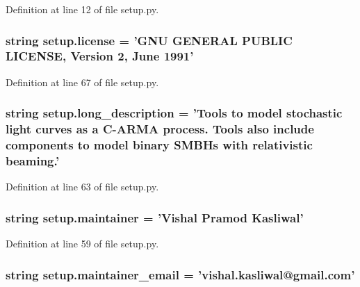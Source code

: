 Definition at line 12 of file setup.\-py.

\hypertarget{namespacesetup_aae5aa7c9d1cf462778a54e8f6a874c6f}{
\subsubsection[{license}]{\setlength{\rightskip}{0pt plus 5cm}string setup.\-license = 'G\-N\-U G\-E\-N\-E\-R\-A\-L P\-U\-B\-L\-I\-C L\-I\-C\-E\-N\-S\-E, Version 2, June 1991'}}\label{namespacesetup_aae5aa7c9d1cf462778a54e8f6a874c6f}


Definition at line 67 of file setup.\-py.

\hypertarget{namespacesetup_a005c7e45ae91a23fbf155fca8b6a99d0}{
\subsubsection[{long\-\_\-description}]{\setlength{\rightskip}{0pt plus 5cm}string setup.\-long\-\_\-description = 'Tools to model stochastic light curves as a C-\/A\-R\-M\-A process. Tools also include components to model binary S\-M\-B\-Hs with relativistic beaming.'}}\label{namespacesetup_a005c7e45ae91a23fbf155fca8b6a99d0}


Definition at line 63 of file setup.\-py.

\hypertarget{namespacesetup_a2d2b97e05b2ec934a59e56cfc0566e8b}{
\subsubsection[{maintainer}]{\setlength{\rightskip}{0pt plus 5cm}string setup.\-maintainer = 'Vishal Pramod Kasliwal'}}\label{namespacesetup_a2d2b97e05b2ec934a59e56cfc0566e8b}


Definition at line 59 of file setup.\-py.

\hypertarget{namespacesetup_a722cbcdb0d00c919cbbdd9ffafc96e74}{
\subsubsection[{maintainer\-\_\-email}]{\setlength{\rightskip}{0pt plus 5cm}string setup.\-maintainer\-\_\-email = 'vishal.\-kasliwal@gmail.\-com'}}\label{namespacesetup_a722cbcdb0d00c919cbbdd9ffafc96e74}


